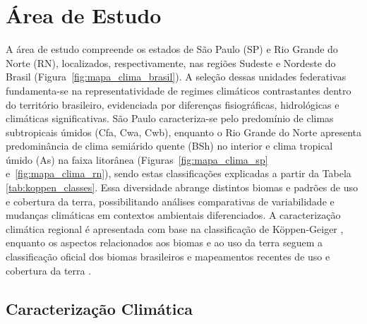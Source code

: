 \chapter{Área de Estudo}
\label{cap:area_estudo}

A área de estudo compreende os estados de São Paulo (SP) e Rio Grande do Norte (RN), localizados, respectivamente, nas regiões Sudeste e Nordeste do Brasil (Figura~\ref{fig:mapa_clima_brasil}). A seleção dessas unidades federativas fundamenta-se na representatividade de regimes climáticos contrastantes dentro do território brasileiro, evidenciada por diferenças fisiográficas, hidrológicas e climáticas significativas. São Paulo caracteriza-se pelo predomínio de climas subtropicais úmidos (Cfa, Cwa, Cwb), enquanto o Rio Grande do Norte apresenta predominância de clima semiárido quente (BSh) no interior e clima tropical úmido (As) na faixa litorânea (Figuras~\ref{fig:mapa_clima_sp} e~\ref{fig:mapa_clima_rn}), sendo estas classificações explicadas a partir da Tabela \ref{tab:koppen_classes}. Essa diversidade abrange distintos biomas e padrões de uso e cobertura da terra, possibilitando análises comparativas de variabilidade e mudanças climáticas em contextos ambientais diferenciados. A caracterização climática regional é apresentada com base na classificação de Köppen-Geiger \citep{alvares2013, Kottek2006}, enquanto os aspectos relacionados aos biomas e ao uso da terra seguem a classificação oficial dos biomas brasileiros e mapeamentos recentes de uso e cobertura da terra \citep{ibge_biomas2004,ibge_biomas_pagina,mapbiomas_collection8_platform}.

\section{Caracterização Climática}

